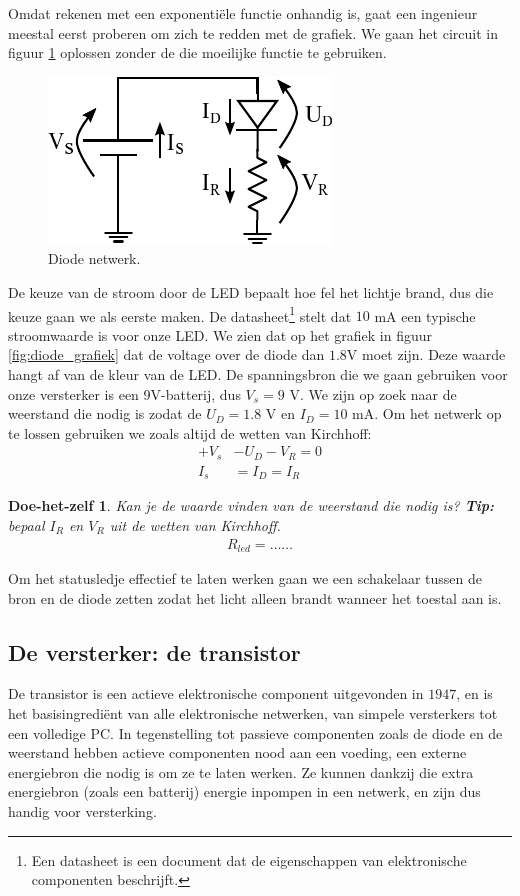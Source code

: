\documentclass{article}
\newtheorem{DIY}{Doe-het-zelf}
\begin{document}
			Omdat rekenen met een exponenti\"ele functie onhandig is, gaat een ingenieur meestal eerst proberen om zich te redden met de grafiek. We gaan het circuit in figuur \ref{fig:diode_netwerk} oplossen zonder de die moeilijke functie te gebruiken.

			\begin{figure}[htbp]
				\centering
				\includegraphics{diode_netwerk}
				\caption{Diode netwerk.}
				\label{fig:diode_netwerk}
			\end{figure}

			De keuze van de stroom door de LED bepaalt hoe fel het lichtje brand, dus die keuze gaan we als eerste maken. De datasheet\footnote{Een datasheet is een document dat de eigenschappen van elektronische componenten beschrijft.} stelt dat $10$ mA een typische stroomwaarde is voor onze LED. We zien dat op het grafiek in figuur \ref{fig:diode_grafiek} dat de voltage over de diode dan $1.8 $V moet zijn. Deze waarde hangt af van de kleur van de LED. De spanningsbron die we gaan gebruiken voor onze versterker is een 9V-batterij, dus $V_s = 9$ V. We zijn op zoek naar de weerstand die nodig is zodat de $U_D = 1.8$ V en $I_D =10$ mA. Om het netwerk op te lossen gebruiken we zoals altijd de wetten van Kirchhoff:
			\begin{align}
				+V_s &- U_D - V_R = 0  \\
				I_s &= I_D = I_R
			\end{align}

			\begin{DIY} Kan je de waarde vinden van de weerstand die nodig is? \textbf{Tip:} bepaal $I_R$ en $V_R$ uit de wetten van Kirchhoff.
			\begin{align*}
			    R_{led} = \ldots\ldots
			\end{align*}
			\end{DIY}

			Om het statusledje effectief te laten werken gaan we een schakelaar tussen de bron en de diode zetten zodat het licht alleen brandt wanneer het toestal aan is.

		\subsection{De versterker: de transistor}
			De transistor is een actieve elektronische component uitgevonden in $1947$, en is het basisingredi\"ent van alle elektronische netwerken, van simpele versterkers tot een volledige PC. In tegenstelling tot passieve componenten zoals de diode en de weerstand hebben actieve componenten nood aan een voeding, een externe energiebron die nodig is om ze te laten werken. Ze kunnen dankzij die extra energiebron (zoals een batterij) energie inpompen in een netwerk, en zijn dus handig voor versterking.
\end{document}
